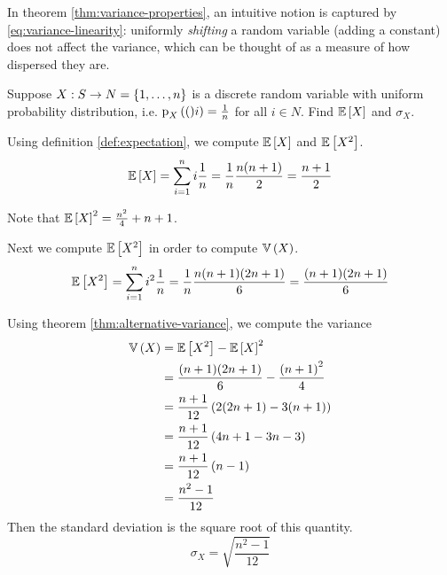 \documentclass[11pt]{article}
\begin{document}
\begin{rem}
    In theorem \ref{thm:variance-properties},
    an intuitive notion is captured by \eqref{eq:variance-linearity}:
    uniformly \emph{shifting} a random variable (adding a constant) does
    not affect the variance, which can be thought of as a measure of how
    dispersed they are.
\end{rem}

\begin{eg}
    Suppose $X : S \to N = \range{n}$ is a discrete random variable
    with uniform probability distribution,
    i.e. $\p[X](i) = \frac{1}{n}$ for all $i \in N$.
    Find $\operatorname{\mathbb{E}}{\left[X\right]}$ and $\sigma_X$.
\end{eg}

\begin{solution}
    Using definition \ref{def:expectation}, we compute $\operatorname{\mathbb{E}}{\left[X\right]}$ and $\operatorname{\mathbb{E}}{\left[X^2\right]}$.
    \begin{equation}
        \label{eq:expectation-discrete-uniform}
        \operatorname{\mathbb{E}}{\left[X\right]}
        = \sum_{i = 1}^n {i \frac{1}{n}} = \frac{1}{n} \frac{n(n+1)}{2}
        = \frac{n+1}{2}
    \end{equation}

    Note that $\operatorname{\mathbb{E}}{\left[X\right]}^2 = \frac{n^2}{4} + n + 1$.

    Next we compute $\operatorname{\mathbb{E}}{\left[X^2\right]}$ in order to compute $\operatorname{\mathbb{V}}{\left(X\right)}$.
    \begin{equation*}
        \operatorname{\mathbb{E}}{\left[X^2\right]}
        = \sum_{i = 1}^n {i^2 \frac{1}{n}}
        = \frac{1}{n} \frac{n(n+1)(2n+1)}{6}
        = \frac{(n+1)(2n+1)}{6}
    \end{equation*}
    \newcommand{\expectXsq}{\ensuremath \frac{(n+1)(2n+1)}{6}}

    Using theorem \ref{thm:alternative-variance}, we compute the variance
    \begin{align*}
        \operatorname{\mathbb{V}}{\left(X\right)}
        &= \operatorname{\mathbb{E}}{\left[X^2\right]} - \operatorname{\mathbb{E}}{\left[X\right]}^2 \\
        &= \frac{(n+1)(2n+1)}{6} - \frac{\left(n+1\right)^2}{4} \\
        &= \frac{n+1}{12}\left(
            2(2n + 1) - 3(n + 1)
        \right) \\
        &= \frac{n+1}{12}\left(
            4n + 1 -3n - 3
        \right) \\
        &= \frac{n+1}{12}\left(
            n - 1
        \right) \\
        &= \frac{n^2 - 1}{12}
    \end{align*}
    Then the standard deviation is the square root of this quantity.
    \begin{equation}
        \label{eq:variance-discrete-uniform}
        \sigma_X = \sqrt{
            \frac{n^2 - 1}{12}
        }
    \end{equation}
\end{solution}
\end{document}

